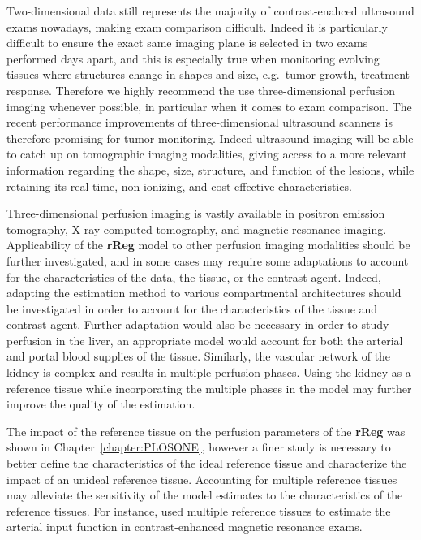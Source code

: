 Two-dimensional data still represents the majority of contrast-enahced ultrasound exams nowadays, making exam comparison difficult.
Indeed it is particularly difficult to ensure the exact same imaging plane is selected in two exams performed days apart, and this is especially true when monitoring evolving tissues where structures change in shapes and size, e.g.~tumor growth, treatment response.
Therefore we highly recommend the use three-dimensional perfusion imaging whenever possible, in particular when it comes to exam comparison.
The recent performance improvements of three-dimensional ultrasound scanners is therefore promising for tumor monitoring.
Indeed ultrasound imaging will be able to catch up on tomographic imaging modalities, giving access to a more relevant information regarding the shape, size, structure, and function of the lesions, while retaining its real-time, non-ionizing, and cost-effective characteristics.

Three-dimensional perfusion imaging is vastly available in positron emission tomography, X-ray computed tomography, and magnetic resonance imaging.
Applicability of the \textbf{rReg} model to other perfusion imaging modalities should be further investigated, and in some cases may require some adaptations to account for the characteristics of the data, the tissue, or the contrast agent.
Indeed, adapting the estimation method to various compartmental architectures should be investigated in order to account for the characteristics of the tissue and contrast agent.
Further adaptation would also be necessary in order to study perfusion in the liver, an appropriate model would account for both the arterial and portal blood supplies of the tissue.
Similarly, the vascular network of the kidney is complex and results in multiple perfusion phases.
Using the kidney as a reference tissue while incorporating the multiple phases in the model may further improve the quality of the estimation.

The impact of the reference tissue on the perfusion parameters of the \textbf{rReg} was shown in Chapter~\ref{chapter:PLOSONE}, however a finer study is necessary to better define the characteristics of the ideal reference tissue and characterize the impact of an unideal reference tissue. 
Accounting for multiple reference tissues may alleviate the sensitivity of the model estimates to the characteristics of the reference tissues. 
For instance, \citet{Yang:2007ki} used multiple reference tissues to estimate the arterial input function in contrast-enhanced magnetic resonance exams.

